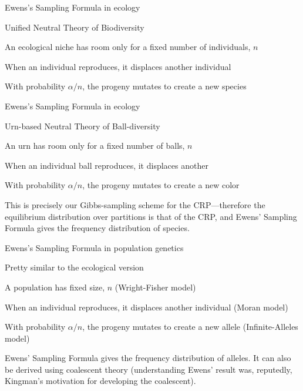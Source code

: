 \documentclass{beamer}
\begin{document}
\begin{frame}{Ewens's Sampling Formula in ecology}

Unified Neutral Theory of Biodiversity
\itemb
\item An ecological niche has room only for a fixed number of individuals, $n$
\item When an individual reproduces, it displaces another individual
\item With probability $\alpha/n$, the progeny mutates to create a new species
\iteme

\end{frame}

\begin{frame}{Ewens's Sampling Formula in ecology}

\alert{Urn-based} Neutral Theory of \alert{Ball-diversity}
\itemb
\item An \alert{urn} has room only for a fixed number of \alert{balls}, $n$
\item When an individual \alert{ball} reproduces, it displaces another
\item With probability $\alpha/n$, the progeny mutates to create a new \alert{color}
\iteme

This is precisely our Gibbs-sampling scheme for the CRP---therefore the equilibrium distribution over partitions is that of the CRP,
and Ewens' Sampling Formula gives the frequency distribution of species.

\end{frame}


\begin{frame}{Ewens's Sampling Formula in population genetics}

Pretty similar to the ecological version
\itemb
\item A population has fixed size, $n$ (\alert{Wright-Fisher model})
\item When an individual reproduces, it displaces another individual (\alert{Moran model})
\item With probability $\alpha/n$, the progeny mutates to create a new allele (\alert{Infinite-Alleles model})
\iteme

Ewens' Sampling Formula gives the frequency distribution of alleles.
It can also be derived using \alert{coalescent theory} (understanding Ewens' result was, reputedly, Kingman's motivation for developing the coalescent).

\end{frame}
\end{document}
